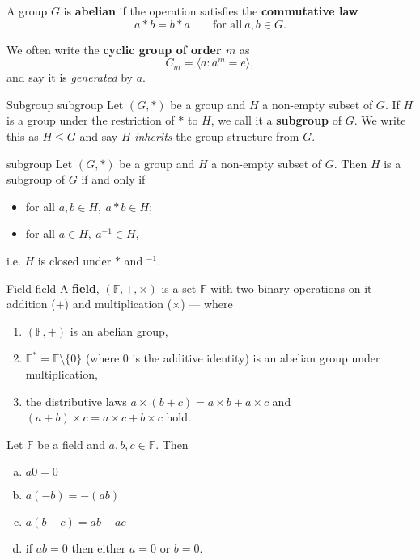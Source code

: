 A group $G$ is \textbf{abelian} if the operation satisfies the \textbf{commutative law}
$$ a * b = b * a \qquad \text{for all} \ a, b \in G . $$

We often write the \textbf{cyclic group of order $m$} as
$$ C_m = \langle a : a^m = e \rangle , $$
and say it is \textit{generated} by $a$.

\begin{definition}{Subgroup \cite{math2601_notes}}{subgroup}
Let $(G, *)$ be a group and $H$ a non-empty subset of $G$. If $H$ is a group under the restriction of $*$ to $H$, we call it a \textbf{subgroup} of $G$. We write this as $H \leq G$ and say $H$ \textit{inherits} the group structure from $G$.
\end{definition}

\begin{lemma}{\cite{math2601_notes}}{subgroup}
Let $(G, *)$ be a group and $H$ a non-empty subset of $G$. Then $H$ is a subgroup of $G$ if and only if
\begin{itemize}
	\item for all $a, b \in H, \ a * b \in H$;
	\item for all $a \in H, \ a^{-1} \in H$,
\end{itemize}
i.e. $H$ is closed under $*$ and $^{-1}$.
\end{lemma}

\begin{definition}{Field \cite{math2601_notes}}{field}
A \textbf{field}, $(\mathbb{F}, +, \times)$ is a set $\mathbb{F}$ with two binary operations on it --- addition ($+$) and multiplication ($\times$) --- where
\begin{enumerate}
	\item $(\mathbb{F}, +)$ is an abelian group,
	\item $\mathbb{F}^{*} = \mathbb{F} \setminus \{0\}$ (where 0 is the additive identity) is an abelian group under multiplication,
	\item the distributive laws $a \times (b + c) = a \times b + a \times c$ and $(a + b) \times c = a \times c + b \times c$ hold.
\end{enumerate}
\end{definition}

\begin{lemma}{\cite{math2601_notes}}{}
	Let $\mathbb{F}$ be a field and $a, b, c \in \mathbb{F}$. Then
	\begin{enumerate}[a)]
		\item $a0 = 0$
		\item $a(-b) = -(ab)$
		\item $a(b - c) = ab - ac$
		\item if $ab = 0$ then either $a = 0$ or $b = 0$.
	\end{enumerate}
\end{lemma}

